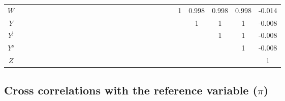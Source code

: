 \begin{tabular}{c|ccccccccccccccccccccccccccc|}
$W$ &  &  &  &  &  &  &  &  &  &  &  &  &  &  &  &  &  &  &  &  &  &  & 1 & 0.998 & 0.998 & 0.998 & -0.014 \\
$Y$ &  &  &  &  &  &  &  &  &  &  &  &  &  &  &  &  &  &  &  &  &  &  &  & 1 & 1 & 1 & -0.008 \\
$Y^{\mathrm{j}}$ &  &  &  &  &  &  &  &  &  &  &  &  &  &  &  &  &  &  &  &  &  &  &  &  & 1 & 1 & -0.008 \\
$Y^{\mathrm{s}}$ &  &  &  &  &  &  &  &  &  &  &  &  &  &  &  &  &  &  &  &  &  &  &  &  &  & 1 & -0.008 \\
$Z$ &  &  &  &  &  &  &  &  &  &  &  &  &  &  &  &  &  &  &  &  &  &  &  &  &  &  & 1 \\
\hline
\end{tabular}


\subsection{Cross correlations with the reference variable ($\pi$)}

